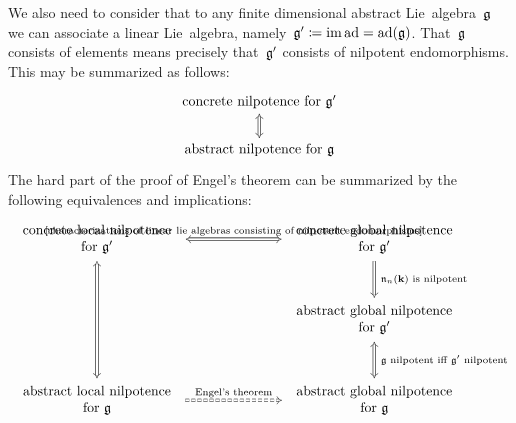 \begin{remark}
  We also need to consider that to any finite dimensional abstract Lie~algebra~$\mathfrak{g}$ we can associate a linear Lie~algebra, namely~$\mathfrak{g}' \coloneqq \operatorname{im} \operatorname{ad} = \operatorname{ad}(\mathfrak{g})$.
  That~$\mathfrak{g}$ consists of {\adnilpotent} elements means precisely that~$\mathfrak{g}'$ consists of nilpotent endomorphisms.
  This may be summarized as follows:
  \[
    \begin{tikzcd}
      \text{concrete nilpotence for~$\glie'$}
      \\
      \text{abstract nilpotence for~$\glie$}
      \arrow[Leftrightarrow]{u}
    \end{tikzcd}
  \]
  The hard part of the proof of Engel’s theorem can be summarized by the following equivalences and implications:
  \[
    \begin{tikzcd}[column sep = 7em, row sep = large]
      \begin{tabular}{c}
        concrete local nilpotence \\
        for~$\glie'$
      \end{tabular}
      \arrow[Leftrightarrow]{r}[above]{\text{\cref{characterizations of linear lie algebras consisting of nilpotent endomorphisms}}}
      &
      \begin{tabular}{c}
        concrete global nilpotence  \\
        for~$\glie'$
      \end{tabular}
      \arrow[Rightarrow]{d}[right]{\;\text{$\nlie_n(\kf)$ is nilpotent}}
      \\
      {}
      &
      \begin{tabular}{c}
        abstract global nilpotence  \\
        for~$\glie'$
      \end{tabular}
      \arrow[Leftrightarrow]{d}[right]{\;\text{$\glie$ nilpotent iff~$\glie'$ nilpotent}}
      \\
      \begin{tabular}{c}
        abstract local nilpotence \\
        for~$\glie$
      \end{tabular}
      \arrow[Leftrightarrow]{uu}
      \arrow[Rightarrow, dashed]{r}[above]{\text{Engel’s  theorem}}
      &
      \begin{tabular}{c}
        abstract global nilpotence \\
        for~$\glie$
      \end{tabular}
    \end{tikzcd}
  \]
  

\end{remark}
